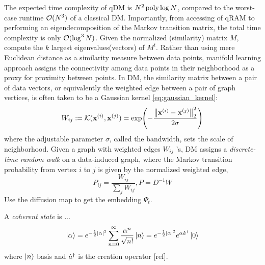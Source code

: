 The expected time complexity of qDM is $N^2 \operatorname{\textup{poly}}\log N$, compared to the worst-case runtime $\mathcal{O}(N^3 )$ of a classical DM. 
Importantly, from accessing of qRAM to performing an eigendecomposition of the Markov transition matrix, the total time complexity is only $\mathcal{O}(\log^3 N)$.
Given the normalized (similarity) matrix $M$, 
compute the $k$ largest eigenvalues(vectors) of $M^t$.
Rather than using mere Euclidean distance as a similarity measure between data points, manifold learning approach assigns the connectivity among data points in their neighborhood as a proxy for proximity between points.
In DM, the similarity matrix between a pair of data vectors, or equivalently the weighted edge between a pair of graph vertices, is often taken to be a Gaussian kernel \cref{eq:gaussian_kernel}:
\begin{equation}
	W_{ij}:=\mathcal{K} (\vb{x}^{(i)},\vb{x}^{(j)}) =
	\exp(-\frac{\norm{\vb{x}^{(i)}-\vb{x}^{(j)}}_2^2}{2\sigma})
	\label{eq:diffusion_map_kernel}
\end{equation}
where the adjustable parameter $\sigma$, called the bandwidth, sets the scale of neighborhood.
Given a graph with weighted edges $W_{ij}$ ’s, DM assigns a \emph{discrete-time random walk} on a data-induced graph, 
where the Markov transition probability from vertex $i$ to $j$ is given by the normalized weighted edge,
\begin{equation}
	P_{ij} = \frac{W_{ij}}{\sum_{j}W_{ij}}
	,
	P = D^{-1} W
\end{equation}
Use the diffusion map to get the embedding $\Psi_t$.
\begin{definition}\label{def:coherent_state}
	A \emph{coherent state} is ...
	\begin{equation}
		\ket{\alpha} 
		= e^{-\frac{1}{2}\abs{\alpha}^2} \sum_{n=0}^{\infty} \frac{\alpha^n}{\sqrt{n!}} \ket{n} 
		= e^{-\frac{1}{2}\abs{\alpha}^2} e^{\alpha\hat{a}^\dagger}\ket{0} 
	\end{equation}
	where $\ket{n}$ basis and $\hat{a}^\dagger$ is the creation operator [ref].
\end{definition}
